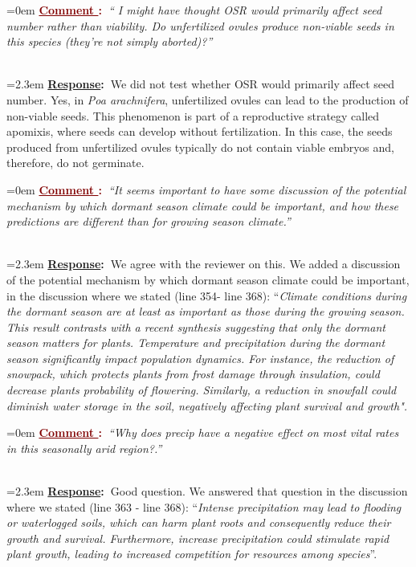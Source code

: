 \documentclass[12pt]{article}
\newcounter{cN}
\newcommand{\comment}[1]{
	\vspace{2em}
	\refstepcounter{cN} %
	\noindent \hangindent=0em \textbf{\textcolor{Maroon}{\uline{Comment \thecN}:~}}\emph{``#1''}
	}
\newcommand{\response}[1]{
	\\[0.25em]
	\hangindent=2.3em \textbf{\textcolor{NavyBlue}{\uline{Response}:~}}#1
	}
\begin{document}
\comment{ I might have thought OSR would primarily affect seed number rather than viability. Do unfertilized ovules produce non-viable seeds in this species (they’re not simply aborted)?}
\response{We did not test whether OSR would primarily affect seed number. 
Yes, in \emph{Poa arachnifera}, unfertilized ovules can lead to the production of non-viable seeds. This phenomenon is part of a reproductive strategy called apomixis, where seeds can develop without fertilization. In this case, the seeds produced from unfertilized ovules typically do not contain viable embryos and, therefore, do not germinate.}

\comment{It seems important to have some discussion of the potential mechanism by which dormant season climate could be important, and how these predictions are
different than for growing season climate.}
\response{We agree with the reviewer on this.  
We added a discussion of the potential mechanism by which dormant season climate could be important, in the discussion where we stated (line  354- line 368): “\emph{Climate conditions during the dormant season are at least as important as those during the growing season. 
This result contrasts with a recent synthesis suggesting that only the dormant season matters for plants. 
Temperature and precipitation during the dormant season significantly impact population dynamics. 
For instance, the reduction of snowpack, which protects plants from frost damage through insulation, could decrease plants probability of flowering. 
Similarly, a reduction in snowfall could diminish water storage in the soil, negatively affecting plant survival and growth".}}

\comment{Why does precip have a negative effect on most vital rates in this seasonally arid region?.}
\response{Good question.
We answered that question in the discussion where we stated (line 363 - line 368): “\emph{Intense precipitation may lead to flooding or waterlogged soils, which can harm plant roots and consequently reduce their growth and survival. 
Furthermore, increase precipitation  could stimulate rapid plant growth, leading to increased competition for resources among species}”.
}
\end{document}
